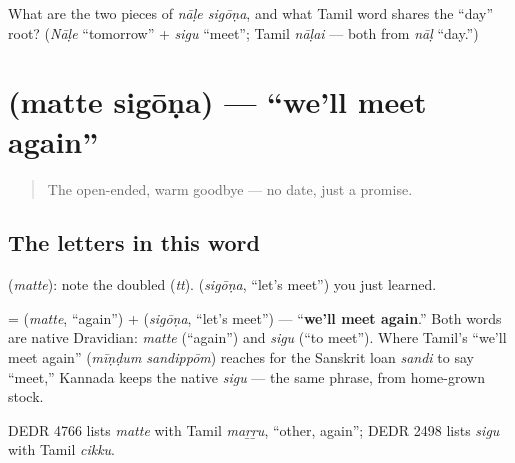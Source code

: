 \begin{tcolorbox}[breakable,colback=teal!4,colframe=teal!35!black,title={Before you move on}]
What are the two pieces of \emph{nāḷe sigōṇa}, and what Tamil word shares the \textquotedblleft{}day\textquotedblright{} root? (\emph{Nāḷe} \textquotedblleft{}tomorrow\textquotedblright{} + \emph{sigu} \textquotedblleft{}meet\textquotedblright{}; Tamil \emph{nāḷai} — both from \emph{nāḷ} \textquotedblleft{}day.\textquotedblright{})
\end{tcolorbox}
\section[\texorpdfstring{\kn{ಮತ್ತೆ} \kn{ಸಿಗೋಣ} (matte sigōṇa)}{ಮತ್ತೆ ಸಿಗೋಣ (matte sigōṇa)}]{  (matte sigōṇa) — \textquotedblleft{}we'll meet again\textquotedblright{}}

\label{lesson:KA-C04-matte-sigona}



\begin{quote}
The open-ended, warm goodbye — no date, just a promise.
\end{quote}

\subsection*{The letters in this word}
\textbf{} (\emph{matte}): note the doubled \textbf{} (\emph{tt}). \textbf{} (\emph{sigōṇa}, \textquotedblleft{}let's meet\textquotedblright{}) you just learned.

\begin{cousinweb}
\textbf{ } = \textbf{} (\emph{matte}, \textquotedblleft{}again\textquotedblright{}) + \textbf{} (\emph{sigōṇa}, \textquotedblleft{}let's meet\textquotedblright{}) — \textquotedblleft{}\textbf{we'll meet again}.\textquotedblright{} Both words are native Dravidian: \emph{matte} (\textquotedblleft{}again\textquotedblright{}) and \emph{sigu} (\textquotedblleft{}to meet\textquotedblright{}). Where Tamil's \textquotedblleft{}we'll meet again\textquotedblright{} (\emph{mīṇḍum sandippōm}) reaches for the Sanskrit loan \emph{sandi} to say \textquotedblleft{}meet,\textquotedblright{} Kannada keeps the native \emph{sigu} — the same phrase, from home-grown stock.

DEDR 4766 lists \emph{matte} with Tamil \emph{maṟṟu}, \textquotedblleft{}other, again\textquotedblright{}; DEDR 2498 lists \emph{sigu} with Tamil \emph{cikku}.
\end{cousinweb}

